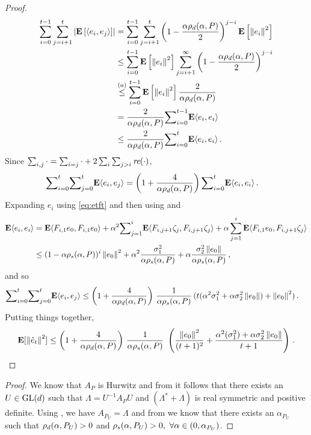 \begin{proof}
\begin{align*}
\label{inter}
\sum_{i=0}^{t-1}\sum_{j=i+1}^t \left|\mathbf{E}\left[\langle e_i,e_j\rangle\right]\right|
&=\sum_{i=0}^{t-1}\sum_{j=i+1}^t \left(1-\frac{\alpha\rho_d(\alpha,P)}{2}\right)^{j-i} \mathbf{E}\left[\left\| e_i\right\|^2\right]\\
&\leq \sum_{i=0}^{t-1} \mathbf{E}\left[\left\| e_i\right\|^2\right] \sum_{j=i+1}^\infty \left(1-\frac{\alpha\rho_d(\alpha,P)}{2}\right)^{j-i} \\
&\stackrel{(a)}{\leq} \sum_{i=0}^{t-1} \mathbf{E}\left[\left\| e_i\right\|^2\right] \frac{2}{\alpha \rho_d(\alpha,P)}\\
&=\frac2{\alpha\rho_d(\alpha,P)} {\sum}_{i=0}^{t-1}\mathbf{E}\langle e_i,e_i\rangle\\
&\leq \frac2{\alpha\rho_d(\alpha,P)}{\sum}_{i=0}^{t}\mathbf{E}\langle e_i,e_i\rangle\,.
\end{align*}
Since $\sum_{i,j}\cdot{} = \sum_{i=j}\cdot{} + 2 \sum_i \sum_{j>i} \emph{re}(\cdot){}$,
\begin{align*}
{\sum}_{i=0}^{t}{\sum}_{j=0}^{t} \mathbf{E}\langle e_i,e_j\rangle&= \left(1+\frac4{\alpha\rho_d(\alpha,P)}\right){\sum}_{i=0}^{t}\mathbf{E}\langle e_i,e_i\rangle\,.
\end{align*}
Expanding $e_i$ using \eqref{eq:etft} and then using  and 
\begin{align*}
\mathbf{E}\langle e_i,e_i\rangle&=\mathbf{E}\langle F_{i,1}e_0,F_{i,1}e_0\rangle+\alpha^2{\sum}_{j=1}^i\mathbf{E}\langle F_{i,j+1}\zeta_j, F_{i,j+1}\zeta_j\rangle+\alpha\sum_{j=1}^i  \mathbf{E}\langle F_{i,1} e_0, F_{i,j+1}\zeta_j\rangle\\
&\leq (1-\alpha\rho_s(\alpha,P))^i\left\| e_0\right\|^2+ \alpha^2\frac{{\sigma}_1^2}{\alpha \rho_s(\alpha,P)}+ \alpha \frac{{\sigma}^2_2 \left\| e_0\right\|}{\alpha\rho_s(\alpha,P)}\,,
\end{align*}
and so
\begin{align*}
{\sum}_{i=0}^{t}{\sum}_{j=0}^{t} \mathbf{E}\langle e_i,e_j\rangle
&\leq \left(1+\frac4{\alpha\rho_d(\alpha,P) }\right)\, \frac1{\alpha\rho_s(\alpha,P)}\, (t(\alpha^2{\sigma}_1^2+\alpha {\sigma}^2_2\left\| e_0\right\|) +\left\| e_0\right\|^2)\,.
\end{align*}
Putting things together,
\begin{align}
\mathbf{E}[\left\| \hat{e}_t\right\|^2]
\leq \left(1+\frac4{\alpha\rho_d(\alpha,P)}\right)\, \frac1{\alpha\rho_s(\alpha,P)}\, \,
\left(\frac{\left\| e_0\right\|^2}{(t+1)^2}+ \frac{\alpha^2(\sigma_1^2)+\alpha \sigma_2^2\left\| e_0\right\|}{t+1} \right)\,.
\end{align}
\end{proof}


\lmhur*
\begin{proof}
We know that $A_P$ is Hurwitz and from   it follows that there exists an $U\in \mathrm{GL}(d)$ such that  $\Lambda=U^{-1} A_P U$ and $(\Lambda^*+\Lambda)$ is real symmetric and positive definite. Using , we have $A_{P_U}=\Lambda$ and from  we know that there exists an $\alpha_{P_U}$ such that $\rho_d(\alpha,P_U)>0$ and $\rho_s(\alpha,P_U)>0,~\forall \alpha \in (0,\alpha_{P_U})$.

\end{proof}



